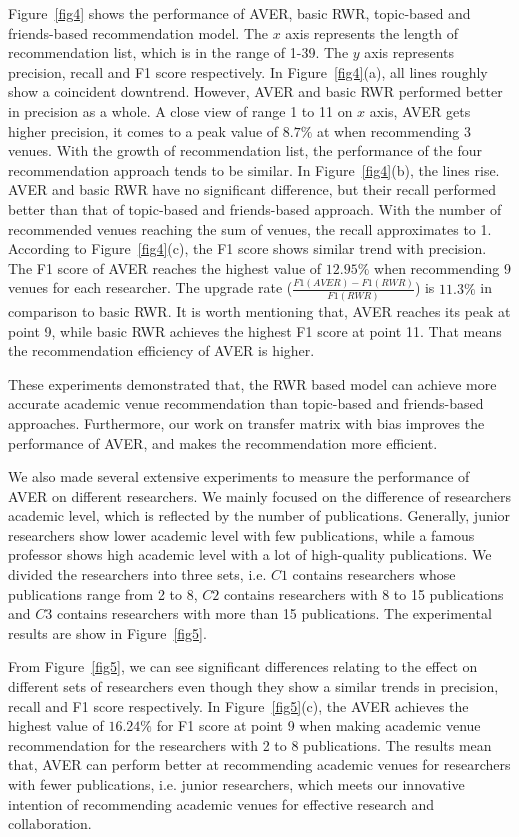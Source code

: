 \documentclass[9pt]{acm_proc_article-sp}
\begin{document}
Figure~\ref{fig4} shows the performance of AVER, basic RWR, topic-based and friends-based recommendation model. The $x$ axis represents the length of recommendation list, which is in the range of 1-39. The $y$ axis represents precision, recall and F1 score respectively. In Figure~\ref{fig4}(a), all lines roughly show a coincident downtrend. However, AVER and basic RWR performed better in precision as a whole. A close view of range 1 to 11 on $x$ axis, AVER gets higher precision, it comes to a peak value of $8.7\%$ at when recommending 3 venues. With the growth of recommendation list, the performance of the four recommendation approach tends to be similar. In Figure~\ref{fig4}(b), the lines rise. AVER and basic RWR have no significant difference, but their recall performed better than that of topic-based and friends-based approach. With the number of recommended venues reaching the sum of venues, the recall approximates to 1. According to Figure~\ref{fig4}(c), the F1 score shows similar trend with precision. The F1 score of AVER reaches the highest value of $12.95\%$ when recommending 9 venues for each researcher. The upgrade rate ($\frac{F1(AVER)-F1(RWR)}{F1(RWR)}$) is $11.3\%$ in comparison to basic RWR. It is worth mentioning that, AVER reaches its peak at point 9, while basic RWR achieves the highest F1 score at point 11. That means the recommendation efficiency of AVER is higher.

These experiments demonstrated that, the RWR based model can achieve more accurate academic venue recommendation than topic-based and friends-based approaches. Furthermore, our work on transfer matrix with bias improves the performance of AVER, and makes the recommendation more efficient.

We also made several extensive experiments to measure the performance of AVER on different researchers. We mainly focused on the difference of researchers academic level, which is reflected by the number of publications. Generally, junior researchers show lower academic level with few publications, while a famous professor shows high academic level with a lot of high-quality publications. We divided the researchers into three sets, i.e. $C1$ contains researchers whose publications range from 2 to 8, $C2$ contains researchers with 8 to 15 publications and $C3$ contains researchers with more than 15 publications. The experimental results are show in Figure~\ref{fig5}.

From Figure~\ref{fig5}, we can see significant differences relating to the effect on different sets of researchers even though they show a similar trends in precision, recall and F1 score respectively. In Figure~\ref{fig5}(c), the AVER achieves the  highest value of $16.24\%$ for F1 score at point 9 when making academic venue recommendation for the researchers with 2 to 8 publications. The results mean that, AVER can perform better at recommending academic venues for researchers with fewer publications, i.e. junior researchers, which meets our innovative intention of recommending academic venues for effective research and collaboration.
\end{document}
